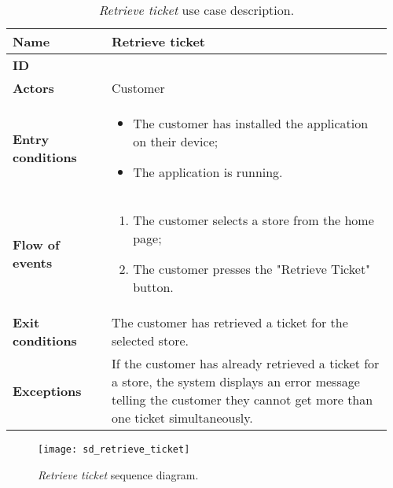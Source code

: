 	\begin{table}[H]
    	\centering
		\begin{tabular}{@{}p{0.25\linewidth}p{0.71\linewidth}@{}}
			\toprule
			\textbf{Name} & Retrieve ticket \\

			\midrule
			\textbf{ID} & \usecaseindex ~\\
			\midrule
			\textbf{Actors} & Customer \\
			\midrule
			\textbf{Entry conditions} &
				\begin{itemize}[leftmargin=.4cm,noitemsep,topsep=0pt,before=\vspace{-3mm},after=\vspace{-4mm}]
					\item The customer has installed the application on their device;
					\item The application is running.
				\end{itemize} \\
			\midrule
			\textbf{Flow of events} &
				\begin{enumerate}[label=\roman*.,leftmargin=.5cm,noitemsep,topsep=0pt,before=\vspace{-3mm},after=\vspace{-4mm}]
					\item The customer selects a store from the home page;
					\item The customer presses the "Retrieve Ticket" button.
				\end{enumerate} \\
			\midrule
			\textbf{Exit conditions} & The customer has retrieved a ticket for the selected store. \\
			\midrule
			\textbf{Exceptions} & If the customer has already retrieved a ticket for a store, the system displays an error message telling the customer they cannot get more than one ticket simultaneously. \\

			\bottomrule
		\end{tabular}
		\caption{\textit{Retrieve ticket} use case description.}
	\end{table}

	\begin{figure}[H]
		\centering
		\texttt{[image: sd\_retrieve\_ticket]}
		\caption{\textit{Retrieve ticket} sequence diagram.}
	\end{figure}

